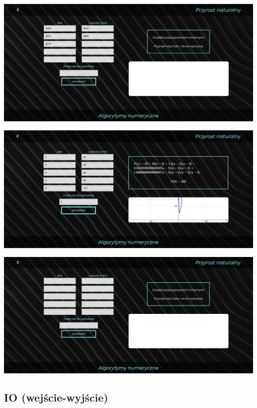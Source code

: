 \documentclass[a4paper,12pt]{article}
\begin{document}
\begin{center}
\includegraphics[width=1\textwidth]{proj1sc2.jpg} \\
\end{center} 

\begin{center}
\includegraphics[width=1\textwidth]{proj1sc3.jpg} \\
\end{center} 

\begin{center}
\includegraphics[width=1\textwidth]{proj1sc4.jpg} \\
\end{center} 

\subsection{IO (wejście-wyjście)}
\end{document}
